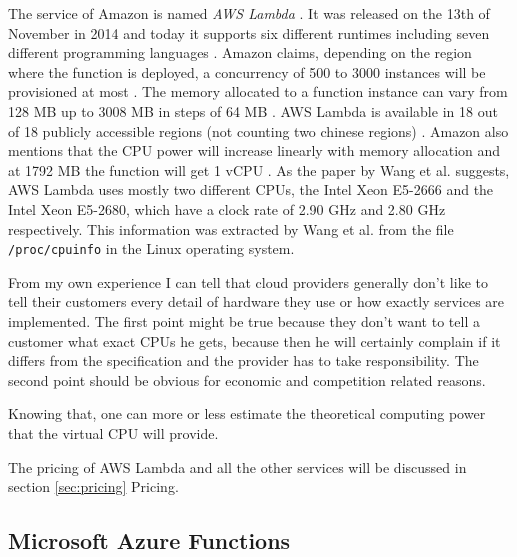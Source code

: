 The service of Amazon is named \textit{\gls{AWS} Lambda} \cite{AWSLambda}. It was released on the 13th of November in 2014 \cite{AWSLambdaRelease} and today it supports six different runtimes including seven different programming languages \cite{AWSLambdaLanguages}. Amazon claims, depending on the region where the function is deployed, a concurrency of 500 to 3000 instances will be provisioned at most \cite{AWSLambdaScaling}. The memory allocated to a function instance can vary from 128 \gls{MB} up to 3008 \gls{MB} in steps of 64 \gls{MB} \cite{AWSLambdaConfig}. \gls{AWS} Lambda is available in 18 out of 18 publicly accessible regions (not counting two chinese regions) \cite{AWSRegions}. Amazon also mentions that the \gls{CPU} power will increase linearly with memory allocation and at 1792 \gls{MB} the function will get 1 \gls{vCPU} \cite{AWSLambdaConfig}. As the paper by Wang et al. \cite{216063} suggests, AWS Lambda uses mostly two different \gls{CPU}s, the Intel Xeon E5-2666 and the Intel Xeon E5-2680, which have a clock rate of 2.90 \gls{GHz} and 2.80 \gls{GHz} respectively. This information was extracted by Wang et al. from the file \texttt{/proc/cpuinfo} in the Linux operating system.
\begin{remark} From my own experience I can tell that cloud providers generally don't like to tell their customers every detail of hardware they use or how exactly services are implemented. The first point might be true because they don't want to tell a customer what exact \gls{CPU}s he gets, because then he will certainly complain if it differs from the specification and the provider has to take responsibility. The second point should be obvious for economic and competition related reasons.
\end{remark}
Knowing that, one can more or less estimate the theoretical computing power that the virtual \gls{CPU} will provide. 
\begin{remark}
The pricing of \gls{AWS} Lambda and all the other services will be discussed in section \ref{sec:pricing} Pricing.
\end{remark}

\subsection{Microsoft Azure Functions}

